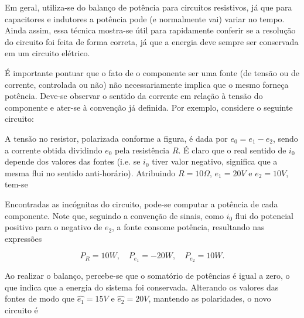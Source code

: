 \documentclass{article}
\numberwithin{equation}{section}
\begin{document}
Em geral, utiliza-se do balanço de potência para circuitos resistivos, já que para capacitores e indutores a potência pode (e normalmente vai) variar no tempo. Ainda assim, essa técnica mostra-se útil para rapidamente conferir se a resolução do circuito foi feita de forma correta, já que a energia deve sempre ser conservada em um circuito elétrico.

É importante pontuar que o fato de o componente ser uma fonte (de tensão ou de corrente, controlada ou não) não necessariamente implica que o mesmo forneça potência. Deve-se observar o sentido da corrente em relação à tensão do componente e ater-se à convenção já definida. Por exemplo, considere o seguinte circuito:

\begin{center}
\end{center}

\noindent A tensão no resistor, polarizada conforme a figura, é dada por $e_0 = e_1 - e_2$, sendo a corrente obtida dividindo $e_0$ pela resistência $R$. É claro que o real sentido de $i_0$ depende dos valores das fontes (i.e. se $i_0$ tiver valor negativo, significa que a mesma flui no sentido anti-horário). Atribuindo $R=10\Omega$, $e_1 = 20V$ e $e_2=10V$, tem-se

\begin{center}
\end{center}

\noindent Encontradas as incógnitas do circuito, pode-se computar a potência de cada componente. Note que, seguindo a convenção de sinais, como $i_0$ flui do potencial positivo para o negativo de $e_2$, a fonte consome potência, resultando nas expressões

$$ P_R = 10W, \quad P_{e_1} = -20W, \quad P_{e_2} = 10W.$$

\noindent Ao realizar o balanço, percebe-se que o somatório de potências é igual a zero, o que indica que a energia do sistema foi conservada. Alterando os valores das fontes de modo que $\widehat{e_1}=15V$ e $\widehat{e_2}=20V$, mantendo as polaridades, o novo circuito é
\end{document}
